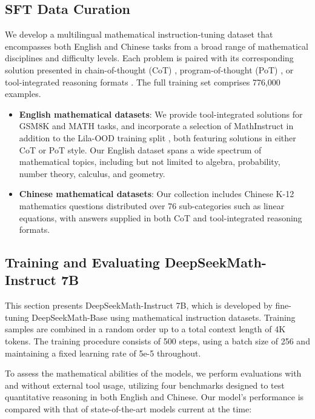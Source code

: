 \begin{itemize}[topsep=0pt]
\subsection{SFT Data Curation}

We develop a multilingual mathematical instruction-tuning dataset that encompasses both English and Chinese tasks from a broad range of mathematical disciplines and difficulty levels. Each problem is paired with its corresponding solution presented in chain-of-thought (CoT) \citep{cot}, program-of-thought (PoT) \citep{pot,pal}, or tool-integrated reasoning formats \citep{tora}. The full training set comprises 776,000 examples.

\begin{itemize}[topsep=0pt]
    \item \textbf{English mathematical datasets}: We provide tool-integrated solutions for GSM8K and MATH tasks, and incorporate a selection of MathInstruct \citep{MathInstruct} in addition to the Lila-OOD training split \citep{lila}, both featuring solutions in either CoT or PoT style. Our English dataset spans a wide spectrum of mathematical topics, including but not limited to algebra, probability, number theory, calculus, and geometry.
    \item \textbf{Chinese mathematical datasets}: Our collection includes Chinese K-12 mathematics questions distributed over 76 sub-categories such as linear equations, with answers supplied in both CoT and tool-integrated reasoning formats.
\end{itemize}

\subsection{Training and Evaluating DeepSeekMath-Instruct 7B}

This section presents DeepSeekMath-Instruct 7B, which is developed by fine-tuning DeepSeekMath-Base using mathematical instruction datasets. Training samples are combined in a random order up to a total context length of 4K tokens. The training procedure consists of 500 steps, using a batch size of 256 and maintaining a fixed learning rate of 5e-5 throughout.

To assess the mathematical abilities of the models, we perform evaluations with and without external tool usage, utilizing four benchmarks designed to test quantitative reasoning in both English and Chinese. Our model's performance is compared with that of state-of-the-art models current at the time:


\end{itemize}

